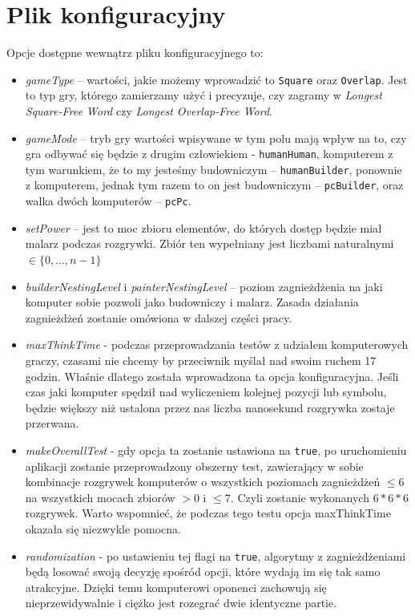 \documentclass[document]{xmgr}
\begin{document}
\section{Plik konfiguracyjny}
Opcje dostępne wewnątrz pliku konfiguracyjnego to:
\begin{itemize}
\item \emph{gameType} -- wartości, jakie możemy wprowadzić to \texttt{Square} oraz \texttt{Overlap}. Jest to typ gry, którego zamierzamy użyć i precyzuje, czy zagramy w \emph{Longest Square-Free Word} czy \emph{Longest Overlap-Free Word}.
\item \emph{gameMode} -- tryb gry wartości wpisywane w tym polu mają wpływ na to, czy gra odbywać się będzie z drugim człowiekiem - \texttt{humanHuman}, komputerem z tym warunkiem, że to my jesteśmy budowniczym -- \texttt{humanBuilder}, ponownie z komputerem, jednak tym razem to on jest budowniczym -- \texttt{pcBuilder}, oraz walka dwóch komputerów -- \texttt{pcPc}.
\item \emph{setPower} -- jest to moc zbioru elementów, do których dostęp będzie miał malarz podczas rozgrywki. Zbiór ten wypełniany jest liczbami naturalnymi $\in \{0, ...,n-1\}$
\item \emph{builderNestingLevel} i \emph{painterNestingLevel} -- poziom zagnieżdżenia na jaki komputer sobie pozwoli jako budowniczy i malarz. Zasada działania zagnieżdżeń zostanie omówiona w dalszej części pracy.
\item \emph{maxThinkTime} - podczas przeprowadzania testów z udziałem komputerowych graczy, czasami nie chcemy by przeciwnik myślał nad swoim ruchem 17 godzin. Właśnie dlatego została wprowadzona ta opcja konfiguracyjna. Jeśli czas jaki komputer spędził nad wyliczeniem kolejnej pozycji lub symbolu, będzie większy niż ustalona przez nas liczba nanosekund rozgrywka zostaje przerwana.
\item \emph{makeOverallTest} - gdy opcja ta zostanie ustawiona na \texttt{true}, po uruchomieniu aplikacji zostanie przeprowadzony obszerny test, zawierający w sobie kombinacje rozgrywek komputerów o wszystkich poziomach zagnieżdżeń $\leq 6$ na wszystkich mocach zbiorów $>0 $ i $\leq 7$. Czyli zostanie wykonanych $6*6*6$ rozgrywek. Warto wspomnieć, że podczas tego testu opcja maxThinkTime okazała się niezwykle pomocna.
\item \emph{randomization} - po ustawieniu tej flagi na \texttt{true}, algorytmy z zagnieżdżeniami będą losować swoją decyzję spośród opcji, które wydają im się tak samo atrakcyjne. Dzięki temu komputerowi oponenci zachowują się nieprzewidywalnie i ciężko jest rozegrać dwie identyczne partie.
\end{itemize}
\end{document}
